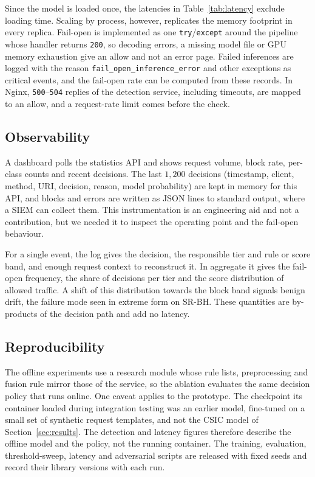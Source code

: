 \documentclass[preprint,11pt]{elsarticle}
\begin{document}
Since the model is loaded once, the latencies in Table~\ref{tab:latency}
exclude loading time. Scaling by process, however, replicates the memory
footprint in every replica. Fail-open is implemented as one
\texttt{try}/\texttt{except} around the pipeline whose handler returns
\texttt{200}, so decoding errors, a missing model file or GPU memory
exhaustion give an allow and not an error page. Failed inferences are
logged with the reason \texttt{fail\_open\_inference\_error} and other
exceptions as critical events, and the fail-open rate can be computed from
these records. In Nginx, \texttt{500}--\texttt{504} replies of the
detection service, including timeouts, are mapped to an allow, and a
request-rate limit comes before the check.

\subsection{Observability}
A dashboard polls the statistics API and shows request volume, block rate,
per-class counts and recent decisions. The last $1{,}200$ decisions
(timestamp, client, method, URI, decision, reason, model probability) are
kept in memory for this API, and blocks and errors are written as JSON lines
to standard output, where a SIEM can collect them. This instrumentation is
an engineering aid and not a contribution, but we needed it to inspect the
operating point and the fail-open behaviour.

For a single event, the log gives the decision, the responsible tier and
rule or score band, and enough request context to reconstruct it. In
aggregate it gives the fail-open frequency, the share of decisions per tier
and the score distribution of allowed traffic. A shift of this distribution
towards the block band signals benign drift, the failure mode seen in
extreme form on SR-BH. These quantities are by-products of the decision
path and add no latency.

\subsection{Reproducibility}
The offline experiments use a research module whose rule lists,
preprocessing and fusion rule mirror those of the service, so the ablation
evaluates the same decision policy that runs online. One caveat applies to
the prototype. The checkpoint its container loaded during integration
testing was an earlier model, fine-tuned on a small set of synthetic
request templates, and not the CSIC model of Section~\ref{sec:results}. The
detection and latency figures therefore describe the offline model and the
policy, not the running container. The training, evaluation,
threshold-sweep, latency and adversarial scripts are released with fixed
seeds and record their library versions with each run.
\end{document}

